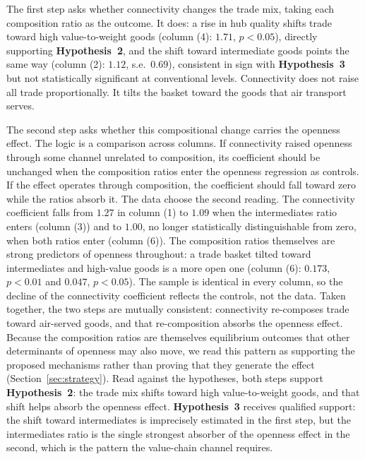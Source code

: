The first step asks whether connectivity changes the trade mix, taking each composition ratio as the outcome. It does: a rise in hub quality shifts trade toward high value-to-weight goods (column (4): $1.71$, $p<0.05$), directly supporting \textbf{Hypothesis~2}, and the shift toward intermediate goods points the same way (column (2): $1.12$, s.e.\
$0.69$), consistent in sign with \textbf{Hypothesis~3} but not statistically significant at conventional levels. Connectivity does not raise all trade proportionally. It tilts the basket toward the goods that air transport serves.

The second step asks whether this compositional change carries the openness effect. The logic is a comparison across columns. If connectivity raised openness through some channel unrelated to composition, its coefficient should be unchanged when the composition ratios enter the openness regression as controls. If the effect operates through composition, the coefficient should fall toward zero while the ratios absorb it. The data choose the second reading. The connectivity coefficient falls from $1.27$ in column (1) to $1.09$ when the
intermediates ratio enters (column (3)) and to $1.00$, no longer statistically distinguishable from zero, when both ratios enter (column (6)). The composition ratios themselves are strong predictors of openness throughout: a trade basket tilted toward intermediates and high-value goods is a more open one (column (6): $0.173$, $p<0.01$ and $0.047$, $p<0.05$). The sample is identical in every column, so the decline of the connectivity coefficient reflects the controls, not the data. Taken together, the two steps are mutually consistent: connectivity re-composes trade toward air-served goods, and that re-composition absorbs the openness effect. Because the composition ratios are themselves equilibrium outcomes that other determinants of openness may also move, we read this pattern as supporting the proposed mechanisms rather than proving that they generate the effect (Section~\ref{sec:strategy}). Read against the hypotheses, both steps support \textbf{Hypothesis~2}: the trade mix shifts toward high value-to-weight goods, and that shift helps absorb the openness effect. \textbf{Hypothesis~3} receives qualified support: the shift toward intermediates
is imprecisely estimated in the first step, but the intermediates ratio is the single strongest absorber of the openness effect in the second, which is the pattern the value-chain channel requires.

